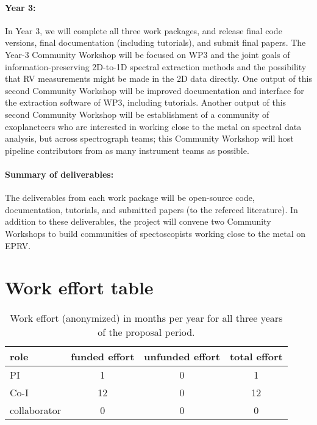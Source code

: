\documentclass[12pt]{article}
\begin{document}
\paragraph{Year 3:}
In Year 3, we will complete all three work packages, and release final code versions, final documentation (including tutorials), and submit final papers.
The Year-3 Community Workshop will be focused on WP3 and the joint goals of information-preserving 2D-to-1D spectral extraction methods and the possibility that RV measurements might be made in the 2D data directly.
One output of this second Community Workshop will be improved documentation and interface for the extraction software of WP3, including tutorials.
Another output of this second Community Workshop will be establishment of a community of exoplaneteers who are interested in working close to the metal on spectral data analysis, but across spectrograph teams; this Community Workshop will host pipeline contributors from as many instrument teams as possible.

\paragraph{Summary of deliverables:}
The deliverables from each work package will be open-source code, documentation, tutorials, and submitted papers (to the refereed literature).
In addition to these deliverables, the project will convene two Community Workshops to build communities of spectoscopists working close to the metal on EPRV.

\clearpage{\raggedright %

}

\clearpage{}
\section*{Work effort table}
\begin{table}[h!]
\sffamily\begin{center}
\begin{tabular}{|l|c|c|c|}
\hline
role & funded effort & unfunded effort & total effort\\
\hline
\hline
           PI &  1 &  0 &  1 \\
         Co-I & 12 &  0 & 12 \\
 collaborator &  0 &  0 &  0 \\
\hline
\end{tabular}
\vspace{-2ex}
\end{center}
\caption{Work effort (anonymized) in months per year \label{tab:anon} for all three years of the proposal period.}
\end{table}
\end{document}
